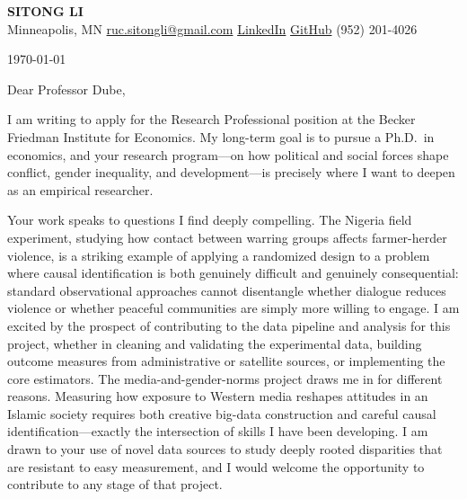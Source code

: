 \documentclass[12pt]{article}
\begin{document}
\begin{center}
  {\LARGE\textbf{\textcolor{accent}{SITONG LI}}} \\[4pt]
  \small Minneapolis, MN
  \;\textbullet\;
  \href{mailto:ruc.sitongli@gmail.com}{ruc.sitongli@gmail.com}
  \;\textbullet\;
  \href{https://linkedin.com/in/YOURHANDLE}{LinkedIn}   %
  \;\textbullet\;
  \href{https://github.com/YOURHANDLE}{GitHub}          %
  \;\textbullet\;
  (952) 201-4026
\end{center}

\vspace{1em}

\noindent \today

\vspace{1em}

\noindent Dear Professor Dube,

\vspace{1em}

I am writing to apply for the Research Professional position at the Becker Friedman
Institute for Economics. My long-term goal is to pursue a Ph.D.\ in economics, and
your research program---on how political and social forces shape conflict, gender
inequality, and development---is precisely where I want to deepen as an empirical
researcher.

Your work speaks to questions I find deeply compelling. The Nigeria field experiment,
studying how contact between warring groups affects farmer-herder violence, is a
striking example of applying a randomized design to a problem where causal
identification is both genuinely difficult and genuinely consequential: standard
observational approaches cannot disentangle whether dialogue reduces violence or
whether peaceful communities are simply more willing to engage. I am excited by the
prospect of contributing to the data pipeline and analysis for this project, whether
in cleaning and validating the experimental data, building outcome measures from
administrative or satellite sources, or implementing the core estimators. The
media-and-gender-norms project draws me in for different reasons. Measuring how
exposure to Western media reshapes attitudes in an Islamic society requires both
creative big-data construction and careful causal identification---exactly the
intersection of skills I have been developing. I am drawn to your use of novel data
sources to study deeply rooted disparities that are resistant to easy measurement,
and I would welcome the opportunity to contribute to any stage of that project.
\end{document}
